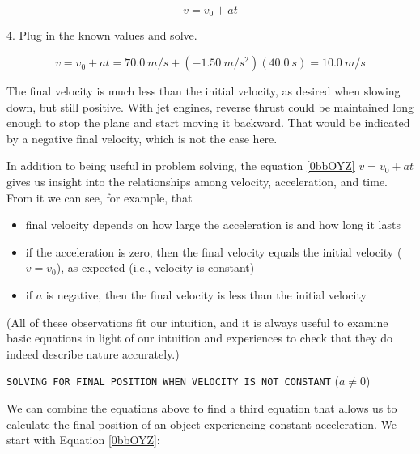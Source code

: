 \documentclass[main-ap-physics.tex]{subfiles}
\begin{document}
\begin{equation*}
    v = v_0 + at
\end{equation*}

4. Plug in the known values and solve.

\begin{equation*}
    v = v_0 + at = \SI{70.0}{m/s} + \left(-\SI{1.50}{m/s^2}\right)\left(\SI{40.0}{s}\right) = \SI{10.0}{m/s}
\end{equation*}

The final velocity is much less than the initial velocity, as desired when slowing down, but still positive. With jet engines, reverse thrust could be maintained long enough to stop the plane and start moving it backward. That would be indicated by a negative final velocity, which is not the case here.

\endsolution 

In addition to being useful in problem solving, the equation \eqref{0bbOYZ} $v = v_0 + at$ gives us insight into the relationships among velocity, acceleration, and time. From it we can see, for example, that

\begin{itemize}
    \item final velocity depends on how large the acceleration is and how long it lasts
    \item if the acceleration is zero, then the final velocity equals the initial velocity ($v=v_0$), as expected (i.e., velocity is constant)
    \item if $a$ is negative, then the final velocity is less than the initial velocity
\end{itemize}

(All of these observations fit our intuition, and it is always useful to examine basic equations in light of our intuition and experiences to check that they do indeed describe nature accurately.)


\vspace{1em}

\cyanhrule

\begin{center}
    \texttt{SOLVING FOR FINAL POSITION WHEN VELOCITY IS NOT CONSTANT} ($a \neq 0 $)
\end{center}


We can combine the equations above to find a third equation that allows us to calculate the final position of an object experiencing constant acceleration. We start with Equation \eqref{0bbOYZ}:
\end{document}
